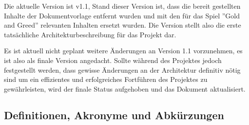 \documentclass[fontsize=12pt,paper=a4,twoside]{scrartcl}
\begin{document}
Die aktuelle Version ist v1.1, Stand dieser Version ist, dass die bereit gestellten Inhalte der Dokumentvorlage entfernt wurden und mit den für das Spiel ''Gold and Greed'' relevanten Inhalten ersetzt wurden. Die Version stellt also die erste tatsächliche Architekturbeschreibung für das Projekt dar.

Es ist aktuell nicht geplant weitere Änderungen an Version 1.1 vorzunehmen, es ist also als finale Version angedacht. Sollte während des Projektes jedoch festgestellt werden, dass gewisse Änderungen an der Architektur definitiv nötig sind um ein effizientes und erfolgreiches Fortführen des Projektes zu gewährleisten, wird der finale Status aufgehoben und das Dokument aktualisiert.

  
\subsection{Definitionen, Akronyme und Abkürzungen}
\end{document}

